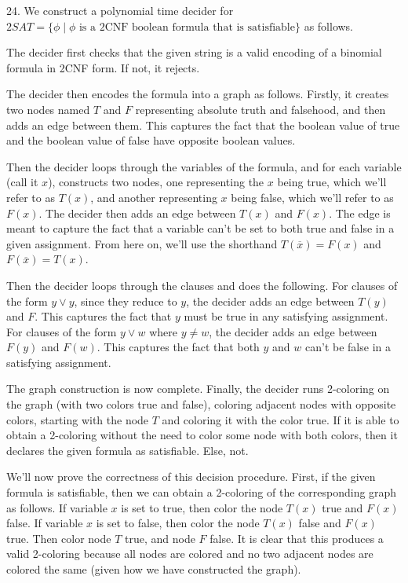 \documentclass{article}
\begin{document}
24. We construct a polynomial time decider for $2SAT = \{\phi \mid \phi \text{ is a 2CNF boolean formula that is satisfiable}\}$ as follows.

The decider first checks that the given string is a valid encoding of a binomial formula in 2CNF form. If not, it rejects.

The decider then encodes the formula into a graph as follows. Firstly, it creates two nodes named $T$ and $F$ representing absolute truth and falsehood, and then adds an edge between them. This captures the fact that the boolean value of true and the boolean value of false have opposite boolean values.

Then the decider loops through the variables of the formula, and for each variable (call it $x$), constructs two nodes, one representing the $x$ being true, which we'll refer to as $T(x)$, and another representing $x$ being false, which we'll refer to as $F(x)$. The decider then adds an edge between $T(x)$ and $F(x)$. The edge is meant to capture the fact that a variable can't be set to both true and false in a given assignment. From here on, we'll use the shorthand $T(\overline{x}) = F(x)$ and $F(\overline{x}) = T(x)$.

Then the decider loops through the clauses and does the following. For clauses of the form $y \lor y$, since they reduce to $y$, the decider adds an edge between $T(y)$ and $F$. This captures the fact that $y$ must be true in any satisfying assignment. For clauses of the form $y \lor w$ where $y \ne w$, the decider adds an edge between $F(y)$ and $F(w)$. This captures the fact that both $y$ and $w$ can't be false in a satisfying assignment.

The graph construction is now complete. Finally, the decider runs 2-coloring on the graph (with two colors true and false), coloring adjacent nodes with opposite colors, starting with the node $T$ and coloring it with the color true. If it is able to obtain a 2-coloring without the need to color some node with both colors, then it declares the given formula as satisfiable. Else, not.

We'll now prove the correctness of this decision procedure. First, if the given formula is satisfiable, then we can obtain a 2-coloring of the corresponding graph as follows. If variable $x$ is set to true, then color the node $T(x)$ true and $F(x)$ false. If variable $x$ is set to false, then color the node $T(x)$ false and $F(x)$ true. Then color node $T$ true, and node $F$ false. It is clear that this produces a valid 2-coloring because all nodes are colored and no two adjacent nodes are colored the same (given how we have constructed the graph).
\end{document}
